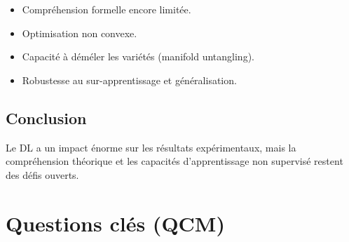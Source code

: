 \documentclass[a4paper,11pt]{article}
\theoremstyle{definition}
\theoremstyle{remark}
\begin{document}
\begin{itemize}
  \item Compr\'ehension formelle encore limit\'ee.
  \item Optimisation non convexe.
  \item Capacit\'e \`a d\'em\'eler les vari\'et\'es (manifold
    untangling).
  \item Robustesse au sur-apprentissage et g\'en\'eralisation.
\end{itemize}

\subsection{Conclusion}

Le DL a un impact \'enorme sur les r\'esultats exp\'erimentaux,
mais la compr\'ehension th\'eorique et les capacit\'es
d'apprentissage non supervis\'e restent des d\'efis ouverts.

\newpage
\section*{Questions cl\'es (QCM)}
\end{document}
